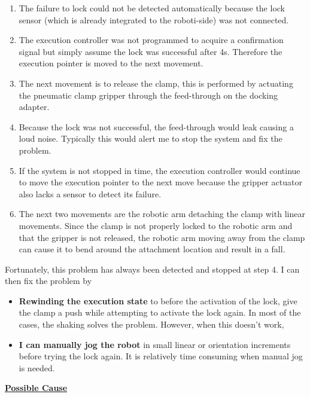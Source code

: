 \begin{enumerate}
	\item The failure to lock could not be detected automatically because the lock sensor (which is already integrated to the roboti-side) was not connected.

	\item The execution controller was not programmed to acquire a confirmation signal but simply assume the lock was successful after 4s. Therefore the execution pointer is moved to the next movement.

	\item The next movement is to release the clamp, this is performed by actuating the pneumatic clamp gripper through the feed-through on the docking adapter.

	\item Because the lock was not successful, the feed-through would leak causing a loud noise. Typically this would alert me to stop the system and fix the problem.

	\item If the system is not stopped in time, the execution controller would continue to move the execution pointer to the next move because the gripper actuator also lacks a sensor to detect its failure.

	\item The next two movements are the robotic arm detaching the clamp with linear movements. Since the clamp is not properly locked to the robotic arm and that the gripper is not released, the robotic arm moving away from the clamp can cause it to bend around the attachment location and result in a fall. 

\end{enumerate}
Fortunately, this problem has always been detected and stopped at step 4. I can then fix the problem by 

\begin{itemize}
	\item \textbf{Rewinding the execution state }to before the activation of the lock, give the clamp a push while attempting to activate the lock again. In most of the cases, the shaking solves the problem. However, when this doesn’t work,

	\item \textbf{I can manually jog the robot} in small linear or orientation increments before trying the lock again. It is relatively time consuming when manual jog is needed.

\end{itemize}
\textbf{\ul{Possible Cause}}

